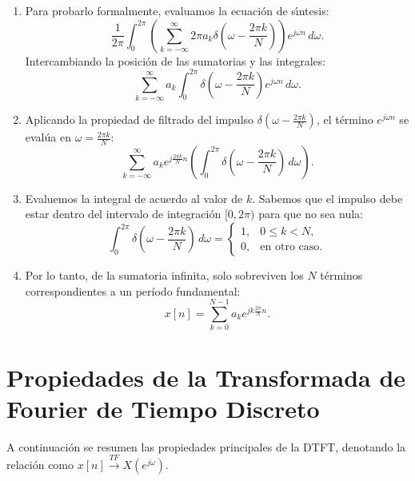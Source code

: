 \documentclass[11pt,a4paper,openany]{book}
\begin{document}
\begin{enumerate}
	\item Para probarlo formalmente, evaluamos la ecuación de s\'{\i}ntesis:
	\begin{equation}
		\frac{1}{2\pi} \int_{0}^{2\pi} \left( \sum_{k=-\infty}^{\infty} 2\pi a_{k} \delta\left(\omega - \frac{2\pi k}{N}\right) \right) e^{j\omega n} \, d\omega.
	\end{equation}
	Intercambiando la posici\'{o}n de las sumatorias y las integrales:
	\begin{equation}
		\sum_{k=-\infty}^{\infty} a_{k} \int_{0}^{2\pi} \delta\left(\omega - \frac{2\pi k}{N}\right) e^{j\omega n} \, d\omega.
	\end{equation}
	
	\item Aplicando la propiedad de filtrado del impulso $\delta\left(\omega - \frac{2\pi k}{N}\right)$, el término $e^{j\omega n}$ se evalúa en $\omega = \frac{2\pi k}{N}$:
	\begin{equation}
		\sum_{k=-\infty}^{\infty} a_{k} e^{j\frac{2\pi k}{N}n} \left( \int_{0}^{2\pi} \delta\left(\omega - \frac{2\pi k}{N}\right) \, d\omega \right).
	\end{equation}
	
	\item Evaluemos la integral de acuerdo al valor de $k$. Sabemos que el impulso debe estar dentro del intervalo de integración $[0, 2\pi)$ para que no sea nula:
	\begin{equation}
		\int_{0}^{2\pi} \delta\left(\omega - \frac{2\pi k}{N}\right) \, d\omega = 
		\begin{cases}
			1, & 0 \leq k < N, \\ 
			0, & \text{en otro caso}.
		\end{cases}
	\end{equation}
	
	\item Por lo tanto, de la sumatoria infinita, solo sobreviven los $N$ términos correspondientes a un período fundamental:
	\begin{equation}
		x[n] = \sum_{k=0}^{N-1} a_{k} e^{jk\frac{2\pi}{N}n}.
	\end{equation}
\end{enumerate}

\section{Propiedades de la Transformada de Fourier de Tiempo Discreto}

A continuación se resumen las propiedades principales de la DTFT, denotando la relación como $x[n] \xrightarrow{TF} X(e^{j\omega})$.
\end{document}
